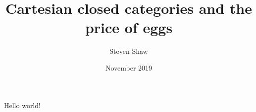 \documentclass{article}
\title{Cartesian closed categories and the price of eggs}
\author{Steven Shaw}
\date{November 2019}
\begin{document}
   \maketitle
   Hello world!
\end{document}
